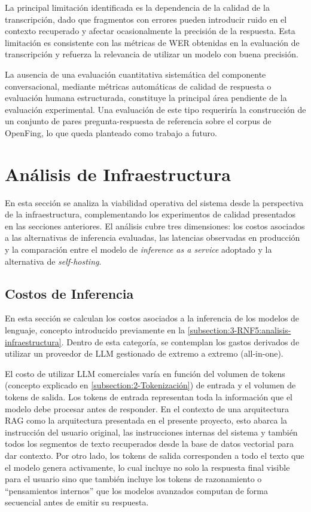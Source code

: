 La principal limitación identificada es la dependencia de la calidad de la transcripción, dado que fragmentos con errores pueden introducir ruido en el contexto recuperado y afectar ocasionalmente la precisión de la respuesta. Esta limitación es consistente con las métricas de WER obtenidas en la evaluación de transcripción y refuerza la relevancia de utilizar un modelo con buena precisión.

La ausencia de una evaluación cuantitativa sistemática del componente conversacional, mediante métricas automáticas de calidad de respuesta o evaluación humana estructurada, constituye la principal área pendiente de la evaluación experimental. Una evaluación de este tipo requeriría la construcción de un conjunto de pares pregunta-respuesta de referencia sobre el corpus de OpenFing, lo que queda planteado como trabajo a futuro. 

\section{Análisis de Infraestructura}
\label{section:6-Infraestructura}

En esta sección se analiza la viabilidad operativa del sistema desde la perspectiva de la infraestructura, complementando los experimentos de calidad presentados en las secciones anteriores. El análisis cubre tres dimensiones: los costos asociados a las alternativas de inferencia evaluadas, las latencias observadas en producción y la comparación entre el modelo de \textit{inference as a service} adoptado y la alternativa de \textit{self-hosting}.

\subsection{Costos de Inferencia}
\label{subsection:6-Costos}

En esta sección se calculan los costos asociados a la inferencia de los modelos de lenguaje, concepto introducido previamente en la \autoref{subsection:3-RNF5:analisis-infraestructura}. Dentro de esta categoría, se contemplan los gastos derivados de utilizar un proveedor de LLM gestionado de extremo a extremo (all-in-one).

El costo de utilizar LLM comerciales varía en función del volumen de tokens (concepto explicado en \autoref{subsection:2-Tokenización}) de entrada y el volumen de tokens de salida. Los tokens de entrada representan toda la información que el modelo debe procesar antes de responder. En el contexto de una arquitectura RAG como la arquitectura presentada en el presente proyecto, esto abarca la instrucción del usuario original, las instrucciones internas del sistema y también todos los segmentos de texto recuperados desde la base de datos vectorial para dar contexto. Por otro lado, los tokens de salida corresponden a todo el texto que el modelo genera activamente, lo cual incluye no solo la respuesta final visible para el usuario sino que también incluye los tokens de razonamiento o ``pensamientos internos'' que los modelos avanzados computan de forma secuencial antes de emitir su respuesta.
 
